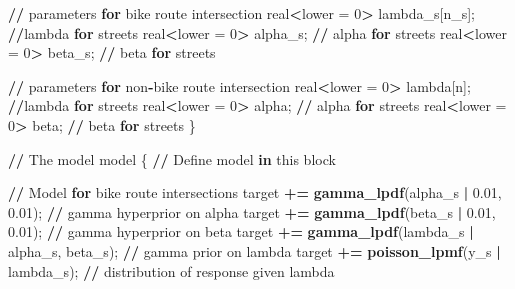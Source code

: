 \documentclass[
]{article}
\newenvironment{Shaded}{\begin{snugshade}}{\end{snugshade}}
\newcommand{\ControlFlowTok}[1]{\textcolor[rgb]{0.13,0.29,0.53}{\textbf{#1}}}
\newcommand{\DecValTok}[1]{\textcolor[rgb]{0.00,0.00,0.81}{#1}}
\newcommand{\ErrorTok}[1]{\textcolor[rgb]{0.64,0.00,0.00}{\textbf{#1}}}
\newcommand{\FloatTok}[1]{\textcolor[rgb]{0.00,0.00,0.81}{#1}}
\newcommand{\KeywordTok}[1]{\textcolor[rgb]{0.13,0.29,0.53}{\textbf{#1}}}
\newcommand{\NormalTok}[1]{#1}
\newcommand{\OperatorTok}[1]{\textcolor[rgb]{0.81,0.36,0.00}{\textbf{#1}}}
\newcommand{\StringTok}[1]{\textcolor[rgb]{0.31,0.60,0.02}{#1}}
\begin{document}
\begin{Shaded}
\begin{Highlighting}[]
  \OperatorTok{/}\ErrorTok{/}\StringTok{ }\NormalTok{parameters }\ControlFlowTok{for}\NormalTok{ bike route intersection}
\NormalTok{  real}\OperatorTok{<}\NormalTok{lower =}\StringTok{ }\DecValTok{0}\OperatorTok{>}\StringTok{ }\NormalTok{lambda_s[n_s]; }\OperatorTok{/}\ErrorTok{/}\NormalTok{lambda }\ControlFlowTok{for}\NormalTok{ streets}
\NormalTok{  real}\OperatorTok{<}\NormalTok{lower =}\StringTok{ }\DecValTok{0}\OperatorTok{>}\StringTok{ }\NormalTok{alpha_s; }\OperatorTok{/}\ErrorTok{/}\StringTok{ }\NormalTok{alpha }\ControlFlowTok{for}\NormalTok{ streets}
\NormalTok{  real}\OperatorTok{<}\NormalTok{lower =}\StringTok{ }\DecValTok{0}\OperatorTok{>}\StringTok{ }\NormalTok{beta_s; }\OperatorTok{/}\ErrorTok{/}\StringTok{ }\NormalTok{beta }\ControlFlowTok{for}\NormalTok{ streets}
  
    \OperatorTok{/}\ErrorTok{/}\StringTok{ }\NormalTok{parameters }\ControlFlowTok{for}\NormalTok{ non}\OperatorTok{-}\NormalTok{bike route intersection}
\NormalTok{  real}\OperatorTok{<}\NormalTok{lower =}\StringTok{ }\DecValTok{0}\OperatorTok{>}\StringTok{ }\NormalTok{lambda[n]; }\OperatorTok{/}\ErrorTok{/}\NormalTok{lambda }\ControlFlowTok{for}\NormalTok{ streets}
\NormalTok{  real}\OperatorTok{<}\NormalTok{lower =}\StringTok{ }\DecValTok{0}\OperatorTok{>}\StringTok{ }\NormalTok{alpha; }\OperatorTok{/}\ErrorTok{/}\StringTok{ }\NormalTok{alpha }\ControlFlowTok{for}\NormalTok{ streets}
\NormalTok{  real}\OperatorTok{<}\NormalTok{lower =}\StringTok{ }\DecValTok{0}\OperatorTok{>}\StringTok{ }\NormalTok{beta; }\OperatorTok{/}\ErrorTok{/}\StringTok{ }\NormalTok{beta }\ControlFlowTok{for}\NormalTok{ streets}
\NormalTok{\}}

\OperatorTok{/}\ErrorTok{/}\StringTok{ }\NormalTok{The model}
\NormalTok{model \{}
  \OperatorTok{/}\ErrorTok{/}\StringTok{ }\NormalTok{Define model }\ControlFlowTok{in}\NormalTok{ this block}
  
  \OperatorTok{/}\ErrorTok{/}\StringTok{ }\NormalTok{Model }\ControlFlowTok{for}\NormalTok{ bike route intersections}
\NormalTok{  target }\OperatorTok{+}\ErrorTok{=}\StringTok{ }\KeywordTok{gamma_lpdf}\NormalTok{(alpha_s }\OperatorTok{|}\StringTok{ }\FloatTok{0.01}\NormalTok{, }\FloatTok{0.01}\NormalTok{); }\OperatorTok{/}\ErrorTok{/}\StringTok{ }\NormalTok{gamma hyperprior on alpha }
\NormalTok{  target }\OperatorTok{+}\ErrorTok{=}\StringTok{ }\KeywordTok{gamma_lpdf}\NormalTok{(beta_s }\OperatorTok{|}\StringTok{ }\FloatTok{0.01}\NormalTok{, }\FloatTok{0.01}\NormalTok{); }\OperatorTok{/}\ErrorTok{/}\StringTok{ }\NormalTok{gamma hyperprior on beta}
\NormalTok{  target }\OperatorTok{+}\ErrorTok{=}\StringTok{ }\KeywordTok{gamma_lpdf}\NormalTok{(lambda_s }\OperatorTok{|}\StringTok{ }\NormalTok{alpha_s, beta_s); }\OperatorTok{/}\ErrorTok{/}\StringTok{ }\NormalTok{gamma prior on lambda}
\NormalTok{  target }\OperatorTok{+}\ErrorTok{=}\StringTok{ }\KeywordTok{poisson_lpmf}\NormalTok{(y_s }\OperatorTok{|}\StringTok{ }\NormalTok{lambda_s); }\OperatorTok{/}\ErrorTok{/}\StringTok{ }\NormalTok{distribution of response given lambda}
  

\end{Highlighting}
\end{Shaded}
\end{document}
